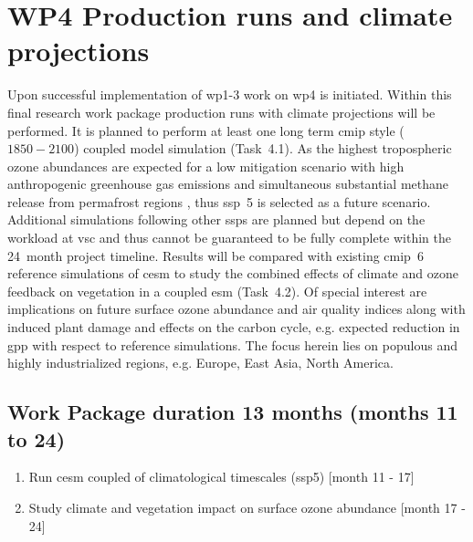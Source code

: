\section{WP4 Production runs and climate projections}
\label{sec:wp4}
Upon successful implementation of \gls{wp}1-3 work on \gls{wp}4 is initiated. Within this final research work package production runs with climate projections will be performed. It is planned to perform at least one long term \gls{cmip} style ($1850-2100$) coupled model simulation (Task~4.1). As the highest tropospheric ozone abundances are expected for a low mitigation scenario with high anthropogenic greenhouse gas emissions and simultaneous substantial methane release from permafrost regions \parencites[e.g.][]{JGR:Rieder2015}{AE:Rieder2018}, thus \gls{ssp}~5 is selected as a future scenario. Additional simulations following other \glspl{ssp} are planned but depend on the workload at \gls{vsc} and thus cannot be guaranteed to be fully complete within the 24~month project timeline. Results will be compared with existing \gls{cmip}~6 reference simulations of \gls{cesm} to study the combined effects of climate and ozone feedback on vegetation in a coupled \gls{esm} (Task~4.2). Of special interest are implications on future surface ozone abundance and air quality indices along with induced plant damage and effects on the carbon cycle, e.g. expected reduction in \gls{gpp} with respect to reference simulations. The focus herein lies on populous and highly industrialized regions, e.g. Europe, East Asia, North America.

\subsection*{Work Package duration 13 months (months 11 to 24)}
\begin{enumerate}[start=1,label={T4.\arabic*}]
  \itemsep0pt
\item Run \gls{cesm} coupled of climatological timescales (\gls{ssp}5) \hfill [month 11 - 17]
\item Study climate and vegetation impact on surface ozone abundance \hfill [month 17 - 24]
\end{enumerate}

